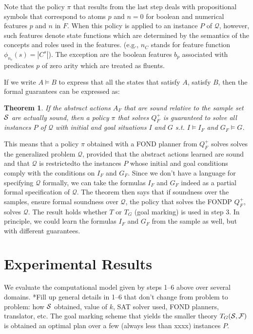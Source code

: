 \documentclass[letterpaper]{article} %
\newtheorem{theorem}[definition]{Theorem}
\newcommand{\Q}{\mathcal{Q}}
\begin{document}
Note that the  policy $\pi$ that results from the last step  deals with propositional symbols
that correspond to atoms $p$ and $n=0$ for boolean and numerical features $p$ and $n$ in $F$. 
When this policy is applied to an instance $P$ of $\Q$, however, such features denote state functions
which are determined by the  semantics of the concepts and roles used in  the features.
(e.g., $n_C$ stands for feature function $\phi_{n_c}(s)=|C^s|$).
The exception are the boolean features $b_p$ associated with
predicates $p$ of zero arity which are treated as fluents.

If we write $A \models B$ to express that all the states that satisfy $A$, satisfy $B$, 
then the formal guarantees can be expressed as:

\begin{theorem}
If the abstract actions $A_F$ that are sound relative to the sample set $\cal S$  are actually sound,
then a   policy $\pi$ that solves  $Q^+_F$  is guaranteed to solve  all instances $P$ of $\Q$
with initial and goal situations $I$ and $G$ s.t. $I \models  I_F$ and $G_F \models G$.
\end{theorem}

This means that a  policy $\pi$ obtained with a FOND planner from $Q^+_F$ 
solves solves the  generalized problem $\Q$, provided that the  abstract
actions learned  are  sound and  that $\Q$ is restrictedto the instances
$P$ whose initial and goal conditions comply with the conditions on $I_F$ and $G_F$.
Since we don't have a language for specifying $\Q$ formally, we can take the formulas
$I_F$ and $G_F$ indeed as a partial formal specification of $\Q$. The theorem then says that
if soundness over the samples, ensure formal soundness over $\Q$, the policy that solves the
FONDP $Q^+_F$, solves $\Q$. The result holds whether $T$ or $T_G$ (goal marking) is used in step 3.
In principle, we could learn the formulas $I_F$ and $G_F$ from the sample as well,  but with different guarantees. 

\section{Experimental Results}

We evaluate the computational model given by steps 1--6 above over several domains. *Fill up general  details in 1--6
that don't change from problem to problem: how ${\cal S}$ obtained, value of $k$, SAT solver used, FOND planners, translator, etc.
The goal marking scheme that  yields the smaller  theory $T_G({\cal S},{\cal F})$ is obtained an optimal plan over
a few (always less than xxxx) instances $P$. 
\end{document}
